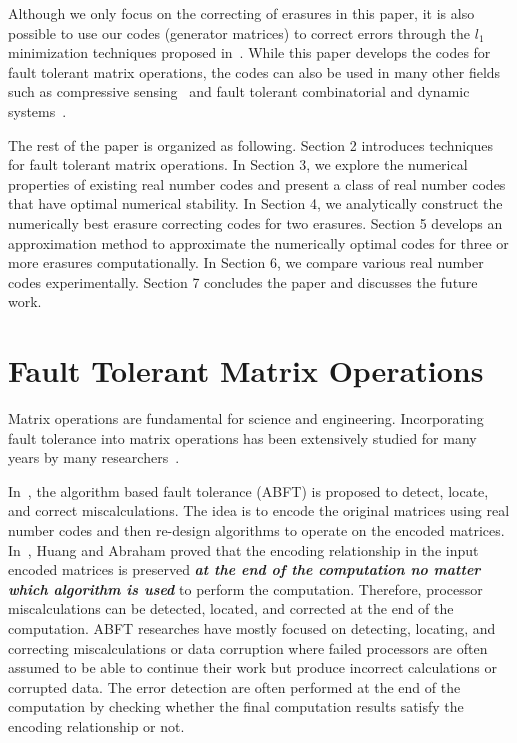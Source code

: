 \documentclass{sig-alternate}
\begin{document}
Although we only focus on the correcting of erasures in this paper,
it is also possible to use our codes (generator matrices) to correct errors 
through the $l_1$ minimization techniques proposed in~\cite{tao:codes, donoho:L1_minimization}.
While this paper develops the codes for fault tolerant matrix operations, 
the codes can also be used in many other fields such as compressive sensing~\cite{donoho:compressed} and fault tolerant  combinatorial and dynamic systems~\cite{hadjicostis:coding}.


The rest of the paper is organized as following. Section 2 introduces 
techniques for fault tolerant matrix operations.
In Section 3, we explore the numerical properties of existing real number
codes and present a class of real number codes that have optimal numerical stability.
In Section 4, we analytically construct the numerically best erasure 
correcting codes for two erasures.
Section 5 develops an approximation method to 
approximate the numerically optimal codes for three 
or more erasures computationally.
In Section 6, we compare various real number codes experimentally.
Section 7 concludes the paper and discusses the future work.


\section{ Fault Tolerant Matrix Operations}

Matrix operations are fundamental for science and engineering.
Incorporating fault tolerance into matrix operations 
has been extensively studied for many years by many researchers~\cite{anfinson:abft, 
Banerjee90:abft, Balasubramanian90:abft, boley92:abft,  
zchen:random_codes, zchen:random_condition, chen:abft, chen:scalable-checkpointing, 
gunnels:abft, huang84:abft, kim96:abft, langou:ft, luk84:abft, 
plank:abft, redinbo2:abft, redinbo:abft, wang:abft}.

In~\cite{huang84:abft}, the algorithm based fault tolerance (ABFT) is proposed to 
detect, locate, and correct miscalculations. The idea is to encode 
the original matrices using real number codes and then re-design 
algorithms to operate on the encoded matrices. In~\cite{huang84:abft}, 
Huang and Abraham proved
that the encoding relationship in the input encoded  matrices 
is preserved \textit{\bf  at the end of the computation 
no matter which algorithm is used} to perform the computation.
Therefore, processor miscalculations can be detected, 
located, and corrected at the end of the computation.
ABFT researches have mostly focused on detecting, locating, 
and correcting miscalculations or data corruption where failed processors are 
often assumed to be able to continue their work
but produce incorrect calculations or corrupted data. The error detection are
often performed at the end of the computation by checking whether the 
final computation results satisfy the encoding relationship or not.
\end{document}
